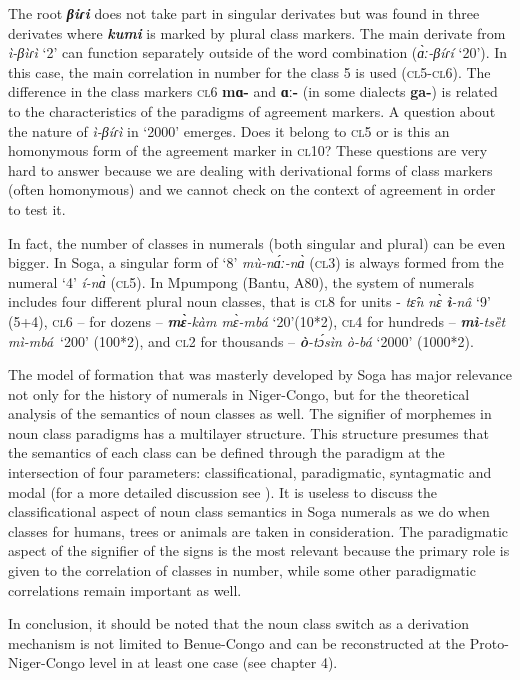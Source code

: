 The root \textbf{\textit{βiɾi}} does not take part in singular derivates but was found in three derivates where \textbf{\textit{kumi}} is marked by plural class markers. The main derivate from \textit{ì-βìɾì} ‘2’ can function separately outside of the word combination (\textit{{\`{ɑ}}ː-β{\'{i}}ɾ{\'{i}}} ‘20’). In this case, the main correlation in number for the class 5 is used (\textsc{cl}5-\textsc{cl}6). The difference in the class markers \textsc{cl}6 \textbf{mɑ-} and \textbf{ɑː-} (in some dialects \textbf{ga-}) is related to the characteristics of the paradigms of agreement markers. A question about the nature of \textit{ì-β{\'{i}}ɾì} in ‘2000’ emerges. Does it belong to \textsc{cl}5 or is this an homonymous form of the agreement marker in \textsc{cl}10? These questions are very hard to answer because we are dealing with derivational forms of class markers (often homonymous) and we cannot check on the context of agreement in order to test it. 

In fact, the number of classes in numerals (both singular and plural) can be even bigger. In Soga, a singular form of `8' \textit{m{\`{u}}-n{\'{ɑ}}ː-n{\`{ɑ}}} (\textsc{cl}3) is always formed from the numeral `4' \textit{{\'{i}}-n{\`{ɑ}}}  (\textsc{cl}5). In Mpumpong (Bantu, A80), the system of numerals includes four different plural noun classes, that is \textsc{cl}8 for units - \textit{t{\^{ɛ}}n} \textit{n{\`{ɛ}}} \textbf{\textit{ì}}\textit{-n{\^{a}}} ‘9’~ (5+4), \textsc{cl}6 – for dozens – \textbf{\textit{m{\`{ɛ}}}}\textit{-k{\`{a}}m m{\`{ɛ}}-mb{\'{a}}} ‘20’(10*2), \textsc{cl}4  for hundreds – \textbf{\textit{mì}}\textit{-tsȅt mì-mb{\'{a}}}~‘200’ (100*2), and \textsc{cl}2  for thousands – \textbf{\textit{{\`{o}}}}\textit{-t{\'{ɔ}}sìn {\`{o}}-b{\'{a}}} ‘2000’ (1000*2).

The model of formation that was masterly developed by Soga has major relevance not only for the history of numerals in Niger-Congo, but for the theoretical analysis of the semantics of noun classes as well. The signifier of morphemes in noun class paradigms has a multilayer structure. This structure presumes that the semantics of each class can be defined through the paradigm at the intersection of four parameters: classificational, paradigmatic, syntagmatic and modal (for a more detailed discussion see \citealt{Pozdniakov2003}). It is useless to discuss the classificational aspect of noun class semantics in Soga numerals as we do when classes for humans, trees or animals are taken in consideration. The paradigmatic aspect of the signifier of the signs is the most relevant because the primary role is given to the correlation of classes in number, while some other paradigmatic correlations remain important as well. 

In conclusion, it should be noted that the noun class switch as a derivation mechanism is not limited to Benue-Congo and can be reconstructed at the Proto-Niger-Congo level in at least one case (see chapter 4). 